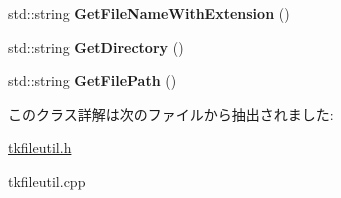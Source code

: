 \begin{DoxyCompactItemize}
\mbox{\label{class_t_k_f_i_l_e_u_t_i_l_1_1_s_h_o_t_f_i_l_e_n_a_m_e_ab86cd404a78edefff8d78910578af6be}} 
std\+::string {\bfseries Get\+File\+Name\+With\+Extension} ()
\item 
\mbox{\label{class_t_k_f_i_l_e_u_t_i_l_1_1_s_h_o_t_f_i_l_e_n_a_m_e_a018228026b6c0bdc2f7e50d084c58393}} 
std\+::string {\bfseries Get\+Directory} ()
\item 
\mbox{\label{class_t_k_f_i_l_e_u_t_i_l_1_1_s_h_o_t_f_i_l_e_n_a_m_e_adecbef97489eafba083b43e5118e11ce}} 
std\+::string {\bfseries Get\+File\+Path} ()
\end{DoxyCompactItemize}


このクラス詳解は次のファイルから抽出されました\+:\begin{DoxyCompactItemize}
\item 
\hyperlink{tkfileutil_8h}{tkfileutil.\+h}\item 
tkfileutil.\+cpp\end{DoxyCompactItemize}
